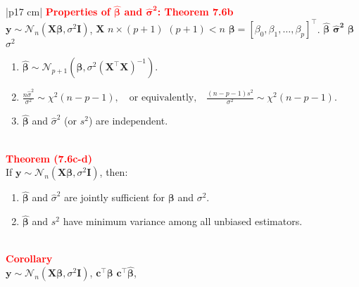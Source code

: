 \documentclass[a4paper,11pt]{article}
\begin{document}
\begin{longtable}{|p{17 cm}|}
\hline
\textcolor{red}{\textbf{Properties of $\mathbf{\hat{\beta}}$ and $\mathbf{\hat{\sigma}^2}$: Theorem 7.6b}} \\
 $\mathbf{y} \sim \mathcal{N}_n(\mathbf{X} \boldsymbol{\beta}, \sigma^2 \mathbf{I})$, 
 $\mathbf{X}$  $n \times (p+1)$  $(p+1) < n$  
$\boldsymbol{\beta} = [\beta_0, \beta_1, \dots, \beta_p]^{\top}$. 
 $\boldsymbol{\hat{\beta}}$  $\mathbf{\hat{\sigma}^2}$  
$\boldsymbol{\beta}$  $\sigma^2$  \\
\begin{minipage}{\linewidth} 
\vspace{-0.03cm}
\begin{enumerate}[noitemsep, topsep=0pt]
    \item
    $
    \boldsymbol{\hat{\beta}} \sim \mathcal{N}_{p+1} \left( \mathbf{\beta}, \sigma^2 (\mathbf{X}^{\top} \mathbf{X})^{-1} \right).
    $
    \item 
    $
    \frac{n \hat{\sigma}^2}{\sigma^2} \sim \chi^2(n - p - 1), \quad \text{or equivalently,} \quad \frac{(n - p - 1)s^2}{\sigma^2} \sim \chi^2(n - p - 1).
    $
    \item $\boldsymbol{\hat{\beta}}$ and $\hat{\sigma}^2$ (or $s^2$) are independent.
\end{enumerate}
\end{minipage} \\
\hline
\textcolor{red}{\textbf{Theorem (7.6c-d)}}\\
If $\mathbf{y} \sim \mathcal{N}_n(\mathbf{X} \boldsymbol{\beta}, \sigma^2 \mathbf{I})$, then:\\
\begin{minipage}{\linewidth} 
\vspace{-0.05cm}
\begin{enumerate}[noitemsep, topsep=0pt]
    \item $\boldsymbol{\hat{\beta}}$ and $\hat{\sigma}^2$ are jointly sufficient for $\boldsymbol{\beta}$ and $\sigma^2$.
    \item $\boldsymbol{\hat{\beta}}$ and $s^2$ have minimum variance among all unbiased estimators.
\end{enumerate} 
\end{minipage} \\
\hline  
\textcolor{red}{\textbf{Corollary}}   \\
 $\mathbf{y} \sim \mathcal{N}_n(\mathbf{X} \boldsymbol{\beta}, \sigma^2 \mathbf{I})$,  $\mathbf{c}^{\top} \boldsymbol{\beta}$  $\mathbf{c}^{\top} \mathbf{\hat{\beta}}$,  

\end{longtable}
\end{document}
